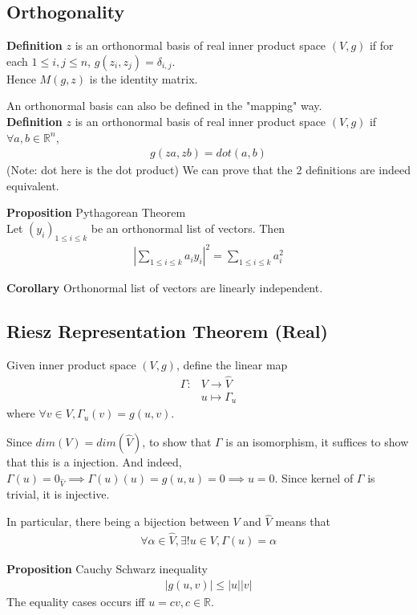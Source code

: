 \documentclass{article}
\begin{document}
\subsection{Orthogonality}
\textbf{Definition} $z$ is an orthonormal basis of real inner product space $(V,g)$ if for each $1\leq i,j\leq n$, $g(z_i,z_j)=\delta_{i,j}$.\\
Hence $M(g,z)$ is the identity matrix.

An orthonormal basis can also be defined in the "mapping" way.\\
\textbf{Definition} $z$ is an orthonormal basis of real inner product space $(V,g)$ if $\forall a,b\in \mathbb{R}^n$,
\begin{align*}
	g(za, zb) = dot(a,b)
\end{align*}
(Note: dot here is the dot product)
We can prove that the 2 definitions are indeed equivalent.

\textbf{Proposition} Pythagorean Theorem\\
Let $(y_i)_{1\leq i\leq k}$ be an orthonormal list of vectors. Then 
\begin{align*}
	\left\lvert \sum_{1\leq i\leq k}a_iy_i\right\rvert^2 = \sum_{1\leq i\leq k}a_i^2
\end{align*}

\textbf{Corollary} Orthonormal list of vectors are linearly independent.

\subsection{Riesz Representation Theorem (Real)}
Given inner product space $(V,g)$, define the linear map
\begin{align*}
	\Gamma: &V\rightarrow \hat{V}\\
	&u\mapsto \Gamma_u
\end{align*}
where $\forall v\in V, \Gamma_u(v) = g(u,v)$.

Since $dim(V)=dim(\hat{V})$, to show that $\Gamma$ is an isomorphism, it suffices to show that this is a injection. And indeed, $\Gamma(u)=0_{\hat{V}}\implies \Gamma(u)(u)=g(u,u)=0\implies u=0$. Since kernel of $\Gamma$ is trivial, it is injective.

In particular, there being a bijection between $V$ and $\hat{V}$ means that 
\begin{align*}
\forall \alpha \in \hat{V}, \exists! u\in V, \Gamma(u) = \alpha
\end{align*}

\textbf{Proposition} Cauchy Schwarz inequality\\
\begin{align*}
	|g(u,v)| \leq |u||v|
\end{align*}
The equality cases occurs iff $u=cv, c\in \mathbb{R}$.
\end{document}
